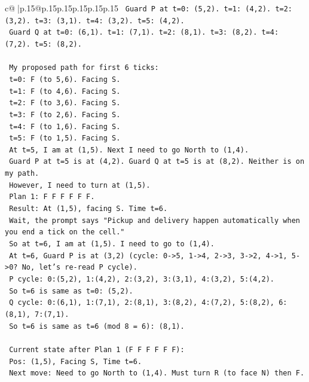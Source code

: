 \documentclass{article}
\begin{document}
{\begin{supertabular}{c@{$\;$}|p{.15\linewidth}@{}p{.15\linewidth}p{.15\linewidth}p{.15\linewidth}p{.15\linewidth}p{.15\linewidth}}
{{{\texttt{      Guard P at t=0: (5,2). t=1: (4,2). t=2: (3,2). t=3: (3,1). t=4: (3,2). t=5: (4,2).} \\
\texttt{      Guard Q at t=0: (6,1). t=1: (7,1). t=2: (8,1). t=3: (8,2). t=4: (7,2). t=5: (8,2).} \\
\\ 
\texttt{      My proposed path for first 6 ticks:} \\
\texttt{      t=0: F (to 5,6). Facing S.} \\
\texttt{      t=1: F (to 4,6). Facing S.} \\
\texttt{      t=2: F (to 3,6). Facing S.} \\
\texttt{      t=3: F (to 2,6). Facing S.} \\
\texttt{      t=4: F (to 1,6). Facing S.} \\
\texttt{      t=5: F (to 1,5). Facing S.} \\
\texttt{      At t=5, I am at (1,5). Next I need to go North to (1,4).} \\
\texttt{      Guard P at t=5 is at (4,2). Guard Q at t=5 is at (8,2). Neither is on my path.} \\
\texttt{      However, I need to turn at (1,5).} \\
\texttt{      Plan 1: F F F F F F.} \\
\texttt{      Result: At (1,5), facing S. Time t=6.} \\
\texttt{      Wait, the prompt says "Pickup and delivery happen automatically when you end a tick on the cell."} \\
\texttt{      So at t=6, I am at (1,5). I need to go to (1,4).} \\
\texttt{      At t=6, Guard P is at (3,2) (cycle: 0{-}>5, 1{-}>4, 2{-}>3, 3{-}>2, 4{-}>1, 5{-}>0? No, let's re{-}read P cycle).} \\
\texttt{      P cycle: 0:(5,2), 1:(4,2), 2:(3,2), 3:(3,1), 4:(3,2), 5:(4,2).} \\
\texttt{      So t=6 is same as t=0: (5,2).} \\
\texttt{      Q cycle: 0:(6,1), 1:(7,1), 2:(8,1), 3:(8,2), 4:(7,2), 5:(8,2), 6:(8,1), 7:(7,1).} \\
\texttt{      So t=6 is same as t=6 (mod 8 = 6): (8,1).} \\
\\ 
\texttt{      Current state after Plan 1 (F F F F F F):} \\
\texttt{      Pos: (1,5), Facing S, Time t=6.} \\
\texttt{      Next move: Need to go North to (1,4). Must turn R (to face N) then F.} \\
}}}
\end{supertabular}}
\end{document}
